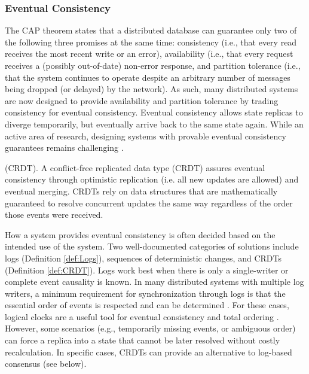 \documentclass{textile}
\begin{document}
\subsubsection{Eventual Consistency} \label{sec:EventualConsistency}

The CAP theorem \cite{brewerRobustDistributedSystems2000,gilbertBrewerConjectureFeasibility2002a} states that a distributed database can guarantee only two of the following three promises at the same time: consistency (i.e., that every read receives the most recent write or an error), availability (i.e., that every request receives a (possibly out-of-date) non-error response, and partition tolerance (i.e., that the system continues to operate despite an arbitrary number of messages being dropped (or delayed) by the network). As such, many distributed systems are now designed to provide availability and partition tolerance by trading consistency for eventual consistency. Eventual consistency allows state replicas to diverge temporarily, but eventually arrive back to the same state again. While an active area of research, designing systems with provable eventual consistency guarantees remains challenging \cite{shapiroComprehensiveStudyConvergent2011a,almeidaDeltaStateReplicated2018}.


\begin{definition} (CRDT). A conflict-free replicated data type (CRDT) assures eventual consistency through optimistic replication (i.e. all new updates are allowed) and eventual merging. CRDTs rely on data structures that are mathematically guaranteed to resolve concurrent updates the same way regardless of the order those events were received. \end{definition} \label{def:CRDT}

How a system provides eventual consistency is often decided based on the intended use of the system. Two well-documented categories of solutions include logs (Definition  \ref{def:Logs}), sequences of deterministic changes, and CRDTs (Definition  \ref{def:CRDT}). Logs work best when there is only a single-writer or complete event causality is known. In many distributed systems with multiple log writers, a minimum requirement for synchronization through logs is that the essential order of events is respected and can be determined \cite{schwarzDetectingCausalRelationships1994,katzInterleavingSetTemporal1990}. For these cases, logical clocks are a useful tool for eventual consistency and total ordering \cite{kulkarniLogicalPhysicalClocks2014}. However, some scenarios (e.g., temporarily missing events, or ambiguous order) can force a replica into a state that cannot be later resolved without costly recalculation. In specific cases, CRDTs can provide an alternative to log-based consensus (see below). 
\end{document}
